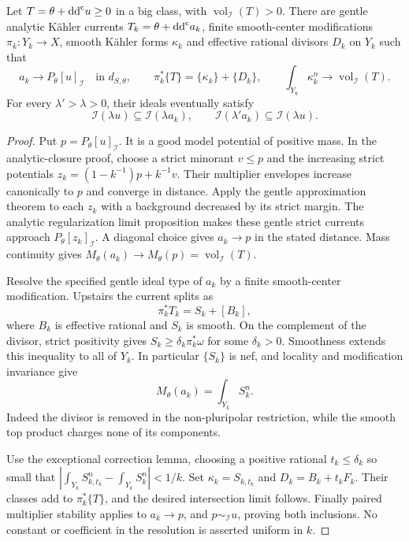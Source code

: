 \begin{theorem}\label{thm:analytic-fujita-multiplier-volume}
Let $T=\theta+\mathrm{dd}^{\mathrm{c}} u\geq0$ in a big class, with $\operatorname{vol}_{\mathcal I}(T)>0$. There are gentle analytic K\"ahler currents $T_k=\theta+\mathrm{dd}^{\mathrm{c}} a_k$, finite smooth-center modifications $\pi_k:Y_k\to X$, smooth K\"ahler forms $\kappa_k$ and effective rational divisors $D_k$ on $Y_k$ such that
\[
 a_k\longrightarrow P_\theta[u]_{\mathcal I}\quad\text{in }d_{S,\theta},
 \qquad \pi_k^*\{T\}=\{\kappa_k\}+\{D_k\},
 \qquad \int_{Y_k}\kappa_k^n\longrightarrow\operatorname{vol}_{\mathcal I}(T).
\]
For every $\lambda'>\lambda>0$, their ideals eventually satisfy
\[
 \mathcal I(\lambda u)\subseteq\mathcal I(\lambda a_k),\qquad
 \mathcal I(\lambda'a_k)\subseteq\mathcal I(\lambda u).
\]
\end{theorem}
\begin{proof}
Put $p=P_\theta[u]_{\mathcal I}$. It is a good model potential of positive mass. In the analytic-closure proof, choose a strict minorant $v\leq p$ and the increasing strict potentials $z_k=(1-k^{-1})p+k^{-1}v$. Their multiplier envelopes increase canonically to $p$ and converge in distance. Apply the gentle approximation theorem to each $z_k$ with a background decreased by its strict margin. The analytic regularization limit proposition makes these gentle strict currents approach $P_\theta[z_k]_{\mathcal I}$. A diagonal choice gives $a_k\to p$ in the stated distance. Mass continuity gives $M_\theta(a_k)\to M_\theta(p)=\operatorname{vol}_{\mathcal I}(T)$.

Resolve the specified gentle ideal type of $a_k$ by a finite smooth-center modification. Upstairs the current splits as
\[
 \pi_k^*T_k=S_k+[B_k],
\]
where $B_k$ is effective rational and $S_k$ is smooth. On the complement of the divisor, strict positivity gives $S_k\geq\delta_k\pi_k^*\omega$ for some $\delta_k>0$. Smoothness extends this inequality to all of $Y_k$. In particular $\{S_k\}$ is nef, and locality and modification invariance give
\[
 M_\theta(a_k)=\int_{Y_k}S_k^n.
\]
Indeed the divisor is removed in the non-pluripolar restriction, while the smooth top product charges none of its components.

Use the exceptional correction lemma, choosing a positive rational $t_k\leq\delta_k$ so small that
$|\int_{Y_k}S_{k,t_k}^n-\int_{Y_k}S_k^n|<1/k$.
Set $\kappa_k=S_{k,t_k}$ and $D_k=B_k+t_kF_k$. Their classes add to $\pi_k^*\{T\}$, and the desired intersection limit follows. Finally paired multiplier stability applies to $a_k\to p$, and $p\sim_{\mathcal I}u$, proving both inclusions. No constant or coefficient in the resolution is asserted uniform in $k$.
\end{proof}

